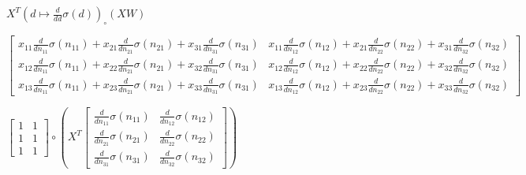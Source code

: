 \documentclass[11pt]{article}
\begin{document}
    
    $\displaystyle X^{T} {\left( d \mapsto \frac{d}{d d} \sigma{\left(d \right)} \right)}_{\circ}\left({X W}\right)$

    
    $\displaystyle \left[\begin{matrix}x_{11} \frac{d}{d n_{11}} \sigma{\left(n_{11} \right)} + x_{21} \frac{d}{d n_{21}} \sigma{\left(n_{21} \right)} + x_{31} \frac{d}{d n_{31}} \sigma{\left(n_{31} \right)} & x_{11} \frac{d}{d n_{12}} \sigma{\left(n_{12} \right)} + x_{21} \frac{d}{d n_{22}} \sigma{\left(n_{22} \right)} + x_{31} \frac{d}{d n_{32}} \sigma{\left(n_{32} \right)}\\x_{12} \frac{d}{d n_{11}} \sigma{\left(n_{11} \right)} + x_{22} \frac{d}{d n_{21}} \sigma{\left(n_{21} \right)} + x_{32} \frac{d}{d n_{31}} \sigma{\left(n_{31} \right)} & x_{12} \frac{d}{d n_{12}} \sigma{\left(n_{12} \right)} + x_{22} \frac{d}{d n_{22}} \sigma{\left(n_{22} \right)} + x_{32} \frac{d}{d n_{32}} \sigma{\left(n_{32} \right)}\\x_{13} \frac{d}{d n_{11}} \sigma{\left(n_{11} \right)} + x_{23} \frac{d}{d n_{21}} \sigma{\left(n_{21} \right)} + x_{33} \frac{d}{d n_{31}} \sigma{\left(n_{31} \right)} & x_{13} \frac{d}{d n_{12}} \sigma{\left(n_{12} \right)} + x_{23} \frac{d}{d n_{22}} \sigma{\left(n_{22} \right)} + x_{33} \frac{d}{d n_{32}} \sigma{\left(n_{32} \right)}\end{matrix}\right]$

    
    $\displaystyle \left[\begin{matrix}1 & 1\\1 & 1\\1 & 1\end{matrix}\right] \circ \left(X^{T} \left[\begin{matrix}\frac{d}{d n_{11}} \sigma{\left(n_{11} \right)} & \frac{d}{d n_{12}} \sigma{\left(n_{12} \right)}\\\frac{d}{d n_{21}} \sigma{\left(n_{21} \right)} & \frac{d}{d n_{22}} \sigma{\left(n_{22} \right)}\\\frac{d}{d n_{31}} \sigma{\left(n_{31} \right)} & \frac{d}{d n_{32}} \sigma{\left(n_{32} \right)}\end{matrix}\right]\right)$
\end{document}
